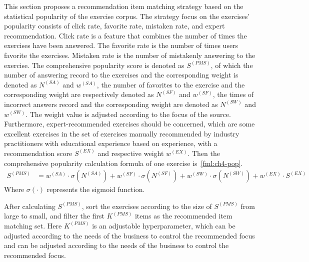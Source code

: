 

This section proposes a recommendation item matching strategy based on the statistical popularity of the exercise corpus. The strategy focus on the exercises' popularity consists of click rate, favorite rate, mistaken rate, and expert recommendation. Click rate is a feature that combines the number of times the exercises have been answered. The favorite rate is the number of times users favorite the exercises. Mistaken rate is the number of mistakenly answering to the exercise. The comprehensive popularity score is denoted as \(S^{(PMS)}\), of which the number of answering record to the exercises and the corresponding weight is denoted as \(N^{(SA)}\) and \(w^{(SA)}\), the number of favorites to the exercise and the corresponding weight are respectively denoted as \(N^{(SF)}\) and \(w^{(SF)} \), the times of incorrect answers record and the corresponding weight are denoted as \(N^{(SW)}\) and \(w^{(SW)}\). The weight value is adjusted according to the focus of the source. Furthermore, expert-recommended exercises should be concerned, which are some excellent exercises in the set of exercises manually recommended by industry practitioners with educational experience based on experience, with a recommendation score \(S^{(EX)}\) and respective weight \(w^{(EX)}\). Then the comprehensive popularity calculation formula of one exercise is~\ref{fml:ch4-pop}.
\begin{align}
    S^{(PMS)} & = w^{(SA)}\cdot \sigma(N^{(SA)})+w^{(SF)}\cdot\sigma(N^{(SF)})+w^{(SW)}\cdot\sigma(N^{(SW)})+w^{(EX)}\cdot S^{(EX)}\label{fml:ch4-pop}
\end{align}
Where \(\sigma(\cdot)\) represents the sigmoid function.

After calculating \(S^{(PMS)}\), sort the exercises according to the size of \(S^{(PMS)}\) from large to small, and filter the first \(K^{(PMS)}\) items as the recommended item matching set. Here \(K^{(PMS)}\) is an adjustable hyperparameter, which can be adjusted according to the needs of the business to control the recommended focus and can be adjusted according to the needs of the business to control the recommended focus.

